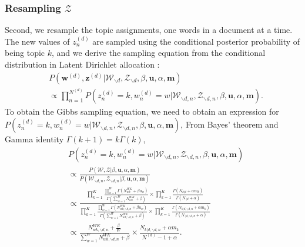    \subsubsection{Resampling $\mathcal{Z}$}  \label{subsec: Resampling Z}
   
   Second, we resample the topic assignments, one words in a document at a time.  The new values of $z^{(d)}_n$ are sampled using the conditional posterior probability of being topic $k$, and we derive the sampling equation from the conditional distribution in Latent Dirichlet allocation \citep{Blei2003}:
     \begin{equation}
     \begin{aligned}
     & P(\boldsymbol{w}^{(d)}, \boldsymbol{z}^{(d)}|\mathcal{W}_{\backslash d}, \mathcal{Z}_{\backslash d}, \beta, \boldsymbol{u}, \alpha, \boldsymbol{m}) \\& \propto \prod_{n=1}^{N^{(d)}}P(z^{(d)}_n=k, w^{(d)}_n=w| \mathcal{W}_{\backslash d, n}, \mathcal{Z}_{\backslash d, n}, \beta, \boldsymbol{u}, \alpha, \boldsymbol{m}).
     \end{aligned}
     \end{equation} 
     To obtain the Gibbs sampling equation, we need to obtain an expression for $P(z^{(d)}_n=k,  w^{(d)}_n=w|\mathcal{W}_{\backslash d, n}, \mathcal{Z}_{\backslash d, n}, \beta, \boldsymbol{u}, \alpha, \boldsymbol{m})$,
     From Bayes' theorem and Gamma identity $\Gamma(k+1)=k\Gamma(k)$,
     \begin{equation}
     \begin{aligned}
     & P(z^{(d)}_n=k, w^{(d)}_n=w|\mathcal{W}_{\backslash d, n}, \mathcal{Z}_{\backslash d, n}, \beta, \boldsymbol{u}, \alpha, \boldsymbol{m}) \\& \propto 
     \frac{P(\mathcal{W}, \mathcal{Z}|\beta, \boldsymbol{u}, \alpha, \boldsymbol{m})}{P(\mathcal{W}_{\backslash d, n}, \mathcal{Z}_{\backslash d, n}|\beta, \boldsymbol{u}, \alpha, \boldsymbol{m})}\\& \propto \frac{\prod_{k=1}^{K}\frac{\prod_{w=1}^W\Gamma(N_{wk}^{WK}+\beta u_w)}{\Gamma(\sum_{w=1}^WN_{wk}^{WK}+\beta )}\times\prod_{k=1}^K\frac{\Gamma(N_{k|d}+\alpha m_k)}{\Gamma(N_{\cdot|d}+\alpha)}}{\prod_{k=1}^{K}\frac{\prod_{w=1}^W\Gamma(N_{wk, \backslash d, n}^{WK}+\beta u_w)}{\Gamma(\sum_{w=1}^WN_{wk, \backslash d, n}^{WK}+\beta )}\times\prod_{k=1}^K\frac{\Gamma(N_{k|d, \backslash d, n}+\alpha m_k)}{\Gamma(N_{\cdot|d, \backslash d, n}+\alpha)}}\\ & \propto 
     \frac{N_{wk, \backslash d, n}^{WK}+\frac{\beta}{W}}{\sum_{w=1}^WN_{wk,  \backslash d, n}^{WK}+\beta}\times\frac{N_{k|d, \backslash d, n}+\alpha m_k}{N^{(d)}-1+\alpha}.
     \end{aligned}
     \end{equation}
